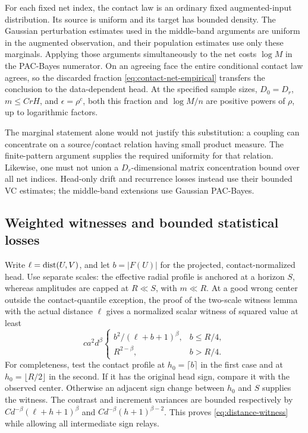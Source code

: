 For each fixed net index, the contact law is an ordinary fixed
augmented-input distribution. Its source is uniform and its target
has bounded density. The Gaussian perturbation estimates used in
the middle-band arguments are uniform in the augmented observation,
and their population estimates use only these marginals.
Applying those arguments simultaneously to the net costs
$\log M$ in the PAC-Bayes numerator. On an agreeing face the entire
conditional contact law agrees, so the discarded fraction
\eqref{eq:contact-net-empirical} transfers the conclusion to the
data-dependent head. At the specified sample sizes, $D_0=D_r$,
$m\le CrH$, and $\epsilon=\rho^c$, both this fraction and
$\log M/n$ are positive powers of $\rho$, up to logarithmic factors.

The marginal statement alone would not justify this substitution:
a coupling can concentrate on a source/contact relation having small
product measure. The finite-pattern argument supplies the required
uniformity for that relation. Likewise, one must not union a
$D_r$-dimensional matrix concentration bound over all net indices.
Head-only drift and recurrence losses instead use their bounded VC
estimates; the middle-band extensions use Gaussian PAC-Bayes.

\subsection{Weighted witnesses and bounded statistical losses}
Write $\ell=\operatorname{dist}(U,V)$, and let $b=|F(U)|$ for the projected,
contact-normalized head. Use separate scales: the effective radial
profile is anchored at a horizon $S$, whereas amplitudes are capped
at $R\ll S$, with $m\ll R$. At a good wrong center outside the
contact-quantile exception, the proof of the two-scale witness lemma
with the actual distance $\ell$ gives a normalized scalar witness of
squared value at least
\begin{equation}\label{eq:distance-witness}
 ca^2d^\beta
 \begin{cases}
 b^2/(\ell+b+1)^\beta,&b\le R/4,\\
 R^{2-\beta},&b>R/4.
 \end{cases}
\end{equation}
For completeness, test the contact profile at $h_0=\lceil b\rceil$
in the first case and at $h_0=\lfloor R/2\rfloor$ in the second.
If it has the original head sign, compare it with the observed center.
Otherwise an adjacent sign change between $h_0$ and $S$ supplies the
witness. The contrast and increment variances are bounded respectively
by $Cd^{-\beta}(\ell+h+1)^\beta$ and
$Cd^{-\beta}(h+1)^{\beta-2}$. This proves
\eqref{eq:distance-witness} while allowing all intermediate sign relays.

